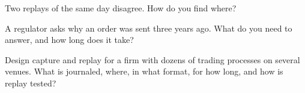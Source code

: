 \begin{interviewq}\label{iq:ll:logging-capture-and-replay:4}
Two replays of the same day disagree. How do you find where?
\end{interviewq}

\begin{interviewq}\label{iq:ll:logging-capture-and-replay:5}
A regulator asks why an order was sent three years ago. What do you need to answer, and how long does it take?
\end{interviewq}

\begin{interviewq}\label{iq:ll:logging-capture-and-replay:6}
Design capture and replay for a firm with dozens of trading processes on several venues. What is journaled, where, in what
format, for how long, and how is replay tested?
\end{interviewq}
